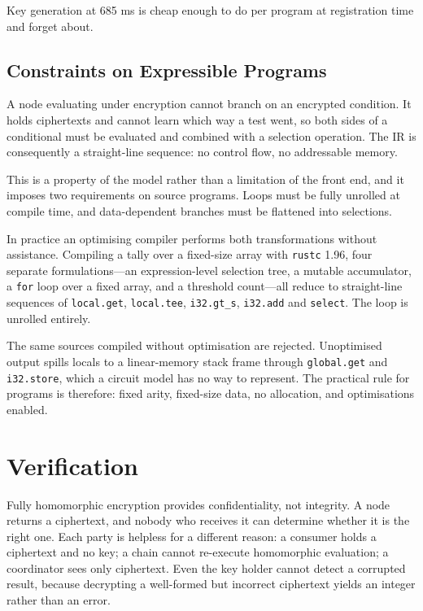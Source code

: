 \documentclass[12pt,a4paper]{article}
\begin{document}
Key generation at 685 ms is cheap enough to do per program at registration time and forget about.

\subsection{Constraints on Expressible Programs}

A node evaluating under encryption cannot branch on an encrypted condition.
It holds ciphertexts and cannot learn which way a test went, so both sides of a conditional must be evaluated and combined with a selection operation.
The IR is consequently a straight-line sequence: no control flow, no addressable memory.

This is a property of the model rather than a limitation of the front end, and it imposes two requirements on source programs.
Loops must be fully unrolled at compile time, and data-dependent branches must be flattened into selections.

In practice an optimising compiler performs both transformations without assistance.
Compiling a tally over a fixed-size array with \texttt{rustc} 1.96, four separate formulations---an expression-level selection tree, a mutable accumulator, a \texttt{for} loop over a fixed array, and a threshold count---all reduce to straight-line sequences of \texttt{local.get}, \texttt{local.tee}, \texttt{i32.gt\_s}, \texttt{i32.add} and \texttt{select}.
The loop is unrolled entirely.

The same sources compiled without optimisation are rejected.
Unoptimised output spills locals to a linear-memory stack frame through \texttt{global.get} and \texttt{i32.store}, which a circuit model has no way to represent.
The practical rule for programs is therefore: fixed arity, fixed-size data, no allocation, and optimisations enabled.

\section{Verification}

Fully homomorphic encryption provides confidentiality, not integrity.
A node returns a ciphertext, and nobody who receives it can determine whether it is the right one.
Each party is helpless for a different reason: a consumer holds a ciphertext and no key; a chain cannot re-execute homomorphic evaluation; a coordinator sees only ciphertext.
Even the key holder cannot detect a corrupted result, because decrypting a well-formed but incorrect ciphertext yields an integer rather than an error.
\end{document}
